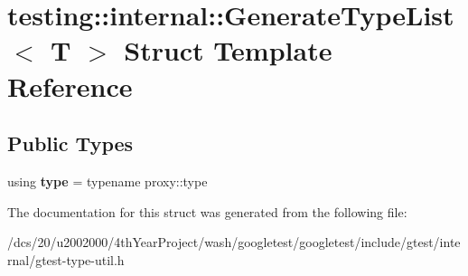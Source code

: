 \hypertarget{structtesting_1_1internal_1_1GenerateTypeList}{}\section{testing\+:\+:internal\+:\+:Generate\+Type\+List$<$ T $>$ Struct Template Reference}
\label{structtesting_1_1internal_1_1GenerateTypeList}
\subsection*{Public Types}
\begin{DoxyCompactItemize}
\item 
\mbox{\label{structtesting_1_1internal_1_1GenerateTypeList_a576a76a145c45be743f9689146cf3fc5}} 
using {\bfseries type} = typename proxy\+::type
\end{DoxyCompactItemize}


The documentation for this struct was generated from the following file\+:\begin{DoxyCompactItemize}
\item 
/dcs/20/u2002000/4th\+Year\+Project/wash/googletest/googletest/include/gtest/internal/gtest-\/type-\/util.\+h\end{DoxyCompactItemize}
